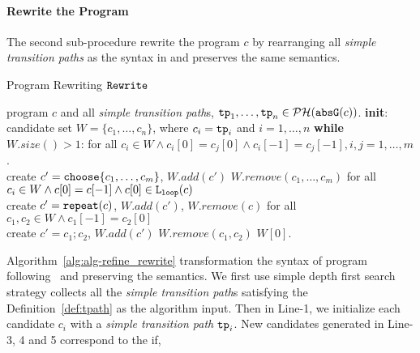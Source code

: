 
\paragraph{Rewrite the Program}
The second sub-procedure rewrite the program $c$ by rearranging all \emph{simple transition paths} as the syntax in \cite{GulwaniJK09} and preserves the same semantics.
{\small
\vspace{-0.5cm}
\begin{algorithm}
\caption{Program Rewriting $\mathtt{Rewrite}$}
\label{alg:alg-refine_rewrite}
\begin{algorithmic}[1]
  \REQUIRE program $c$ and all \emph{simple transition path}s, $\mathtt{tp}_1, \ldots, \mathtt{tp}_n \in \mathcal{PH}(\mathtt{abs}{\mathtt{G}}(c))$.
  \STATE \textbf{init}: candidate set $W = \{c_1, \ldots, c_n\}$, where $c_i = \mathtt{tp}_i$ and $i = 1, \ldots, n$
  \STATE \textbf{while} $W.size()> 1$:
  \STATE \quad 
  for all $c_i \in W \land c_i[0] = c_j[0] \land c_i[-1] = c_j[-1], i, j = 1, \ldots, m$.
  \\ \quad create $c' = \rpchoose{c_1, \ldots, c_m}$, \qquad  $W.add(c')$ \qquad $W.remove(c_1, \ldots, c_m)$
  \STATE
  \quad for all $c_i \in W \land c[0] = c[-1] \land c[0] \in \mathtt{L}_{\mathtt{loop}}(c)$
  \\ \quad create $c' = \mathtt{repeat}(c)$, \qquad $W.add(c')$, \qquad $W.remove(c)$
  \STATE \quad for all $c_1, c_2 \in W \land c_1[-1] = c_2[0]$
  \\
  \quad create $c' = c_1; c_2$, \quad $W.add(c')$ \qquad $W.remove(c_1, c_2)$
  \RETURN $W[0]$.
\end{algorithmic}
\end{algorithm}
\vspace{-0.5cm}
}%
Algorithm~\ref{alg:alg-refine_rewrite} transformation the syntax of program following~\cite{GulwaniJK09} and preserving the semantics.
We first use simple depth first search strategy collects all the \emph{simple transition path}s satisfying the Definition~\ref{def:tpath} as the algorithm input.
Then
in Line-1, we initialize each candidate $c_i$ with a \emph{simple transition path} $\mathtt{tp}_i$. New candidates generated in Line-3, 4 and 5 correspond to the if,
